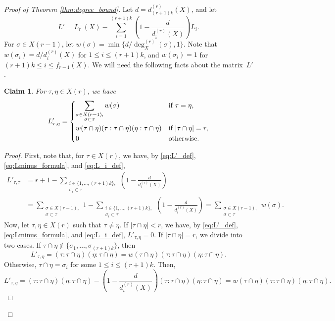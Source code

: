 \documentclass[a4paper,11pt]{article}
\theoremstyle{plain}
\newtheorem{claim}[theorem]{\bf Claim}
\theoremstyle{definition}
\numberwithin{theorem}{section}
\numberwithin{equation}{section}
\begin{document}
\begin{proof}[Proof of Theorem \ref{thm:degree_bound}]
Let $d= d^{(r)}_{(r+1)k}(X)$, and let
\begin{equation}\label{eq:L'_def}
    L' = L_r^{-}(X)- \sum_{i=1}^{(r+1)k} \left(1-\frac{d}{d^{(r)}_i(X)}\right)L_i.
\end{equation}
For $\sigma\in X(r-1)$, let $w(\sigma)=\min\{d/\deg^{(r)}_X(\sigma),1\}$. Note that $w(\sigma_i)=d/d_i^{(r)}(X)$ for $1\le i\le (r+1)k$, and $w(\sigma_i)=1$ for $(r+1)k\le i\le f_{r-1}(X)$. 
We will need the following facts about the matrix~$L'$.
\begin{claim}\label{claim:L'1}
    For $\tau,\eta\in X(r)$, we have
    \[
    L'_{\tau,\eta}=\begin{dcases}
    \sum_{\substack{\sigma\in X(r-1),\\ \sigma\subset \tau}} w(\sigma) & \text{if } \tau=\eta,\\
    w(\tau\cap \eta) (\tau:\tau\cap \eta)(\eta:\tau\cap \eta) & \text{if } |\tau\cap \eta|=r,\\
    0 & \text{otherwise.}
    \end{dcases}
    \]
\end{claim}
\begin{proof}
First, note that, for $\tau\in X(r)$, we have, by \eqref{eq:L'_def}, \eqref{eq:Lminus_formula}, and \eqref{eq:L_i_def}, 
\begin{align*}
   L'_{\tau,\tau} &=
       r+1 - \sum_{\substack{i\in\{1,\ldots,(r+1)k\},\\\sigma_i\subset \tau}}\left(1-\frac{d}{d_i^{(r)}(X)}\right)
      \\& = \sum_{\substack{\sigma\in X(r-1),\\ \sigma\subset \tau}} 1 -\sum_{\substack{i\in\{1,\ldots,(r+1)k\},\\\sigma_i\subset \tau}}\left(1-\frac{d}{d_i^{(r)}(X)}\right) = \sum_{\substack{\sigma\in X(r-1),\\ \sigma\subset \tau}} w(\sigma).
\end{align*}
Now, let $\tau,\eta\in X(r)$ such that $\tau\ne \eta$. If $|\tau\cap \eta|<r$,  we have, by \eqref{eq:L'_def}, \eqref{eq:Lminus_formula}, and \eqref{eq:L_i_def},  $L'_{\tau,\eta}=0$. If $|\tau\cap \eta|=r$, we divide into two cases. If $\tau\cap \eta\notin \{\sigma_1,\ldots,\sigma_{(r+1)k}\}$, then
\[
L'_{\tau,\eta}= (\tau:\tau\cap \eta)(\eta:\tau\cap \eta)= w(\tau\cap \eta) (\tau:\tau\cap \eta)(\eta:\tau\cap \eta).
\]
Otherwise, $\tau\cap \eta=\sigma_i$ for some $1\le i\le (r+1)k$. Then,
\[
L'_{\tau,\eta}= (\tau:\tau\cap \eta)(\eta:\tau\cap \eta)-\left(1-\frac{d}{d_i^{(r)}(X)}\right)(\tau:\tau\cap \eta)(\eta:\tau\cap \eta) =w(\tau\cap \eta) (\tau:\tau\cap \eta)(\eta:\tau\cap \eta).
\]
\end{proof}


\end{proof}
\end{document}
